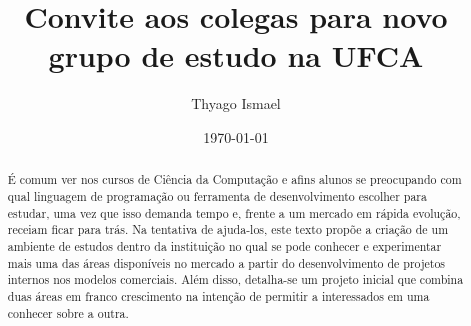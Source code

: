 \documentclass[12pt]{article}
\title{Convite aos colegas para novo grupo de estudo na UFCA}
\author{Thyago Ismael}
\date{\today}
\begin{document}
\maketitle

\begin{abstract}
    É comum ver nos cursos de Ciência da Computação e afins alunos se preocupando com qual linguagem de programação ou ferramenta de desenvolvimento escolher para estudar, uma vez que isso demanda tempo e, frente a um mercado em rápida evolução, receiam ficar para trás. Na tentativa de ajuda-los, este texto propõe a criação de um ambiente de estudos dentro da instituição no qual se pode conhecer e experimentar mais uma das áreas disponíveis no mercado a partir do desenvolvimento de projetos internos nos modelos comerciais. Além disso, detalha-se um projeto inicial que combina duas áreas em franco crescimento na intenção de permitir a interessados em uma conhecer sobre a outra.
\end{abstract}
\vspace{24pt}


\end{document}
